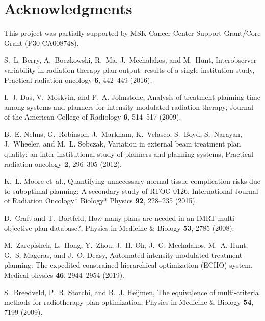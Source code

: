 \documentclass[10pt]{article}
\begin{document}
\section*{Acknowledgments}
This project was partially supported by MSK Cancer Center Support Grant/Core Grant (P30 CA008748).

\begin{thebibliography}{10}

S.~L. Berry, A.~Boczkowski, R.~Ma, J.~Mechalakos, and M.~Hunt,
\newblock Interobserver variability in radiation therapy plan output: results
  of a single-institution study,
\newblock Practical radiation oncology {\bf 6}, 442--449 (2016).

I.~J. Das, V.~Moskvin, and P.~A. Johnstone,
\newblock Analysis of treatment planning time among systems and planners for
  intensity-modulated radiation therapy,
\newblock Journal of the American College of Radiology {\bf 6}, 514--517
  (2009).

B.~E. Nelms, G.~Robinson, J.~Markham, K.~Velasco, S.~Boyd, S.~Narayan,
  J.~Wheeler, and M.~L. Sobczak,
\newblock Variation in external beam treatment plan quality: an
  inter-institutional study of planners and planning systems,
\newblock Practical radiation oncology {\bf 2}, 296--305 (2012).

K.~L. Moore et~al.,
\newblock Quantifying unnecessary normal tissue complication risks due to
  suboptimal planning: A secondary study of RTOG 0126,
\newblock International Journal of Radiation Oncology* Biology* Physics {\bf
  92}, 228--235 (2015).

D.~Craft and T.~Bortfeld,
\newblock How many plans are needed in an IMRT multi-objective plan database?,
\newblock Physics in Medicine \& Biology {\bf 53}, 2785 (2008).

M.~Zarepisheh, L.~Hong, Y.~Zhou, J.~H. Oh, J.~G. Mechalakos, M.~A. Hunt, G.~S.
  Mageras, and J.~O. Deasy,
\newblock Automated intensity modulated treatment planning: The expedited
  constrained hierarchical optimization (ECHO) system,
\newblock Medical physics {\bf 46}, 2944--2954 (2019).

S.~Breedveld, P.~R. Storchi, and B.~J. Heijmen,
\newblock The equivalence of multi-criteria methods for radiotherapy plan
  optimization,
\newblock Physics in Medicine \& Biology {\bf 54}, 7199 (2009).


\end{thebibliography}
\end{document}
